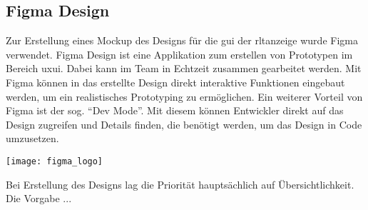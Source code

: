 \subsection{Figma Design}\label{figma_design}


\begin{minipage}{0.6\textwidth}
    Zur Erstellung eines Mockup des Designs für die \acs{gui} der \acs{rltanzeige} wurde Figma verwendet. Figma Design ist eine Applikation zum erstellen von Prototypen im Bereich \ac{uxui}. Dabei kann im Team in Echtzeit zusammen gearbeitet werden. Mit Figma können in das erstellte Design direkt interaktive Funktionen eingebaut werden, um ein realistisches Prototyping zu ermöglichen. Ein weiterer Vorteil von Figma ist der sog. \enquote{Dev Mode}. Mit diesem können Entwickler direkt auf das Design zugreifen und Details finden, die benötigt werden, um das Design in Code umzusetzen. \cite[vgl.][]{figma_design:o.J.}
\end{minipage}%
\hfill
\begin{minipage}{0.37\textwidth}
	\centering	
	\texttt{[image: figma\_logo]}
\end{minipage}
\vspace{1ex}

Bei Erstellung des Designs lag die Priorität hauptsächlich auf Übersichtlichkeit. Die Vorgabe ...